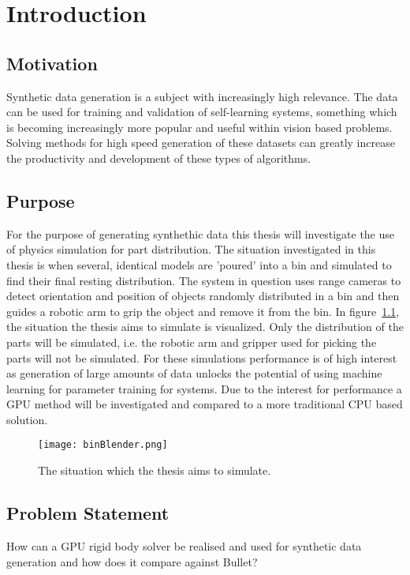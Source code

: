\chapter{Introduction}\label{cha:intro}
\section{Motivation}

Synthetic data generation is a subject with increasingly high relevance.
The data can be used for training and validation of self-learning systems,
something which is becoming increasingly more popular and useful within vision
based problems. Solving methods for high speed generation of these datasets
can greatly increase the productivity and development of these
types of algorithms.

\section{Purpose}
For the purpose of generating synthethic data this thesis will investigate the use of physics
simulation for part distribution. The situation investigated in this thesis
is when several, identical models are 'poured' into a bin and simulated to find their
final resting distribution. The system in question uses range cameras to detect
orientation and position of objects randomly distributed in a bin and then guides
a robotic arm to grip the object and remove it from the bin.
In figure~\ref{fig:plb}, the situation
the thesis aims to simulate is visualized. Only the distribution of the parts
will be simulated, i.e. the robotic arm and gripper used for picking the parts will not be simulated.
 For these simulations
performance is of high interest as generation of large amounts of data unlocks the potential of using machine learning
for parameter training for systems. Due to the interest for performance a GPU method will
be investigated and compared to a more traditional CPU based solution.

\begin{figure}[ht]
  \centering
  \texttt{[image: binBlender.png]}
  \caption{The situation which the thesis aims to simulate.}
  \label{fig:plb}
\end{figure}

\section{Problem Statement}
How can a GPU rigid body solver be realised and used for synthetic data generation
 and how does it compare against Bullet?

